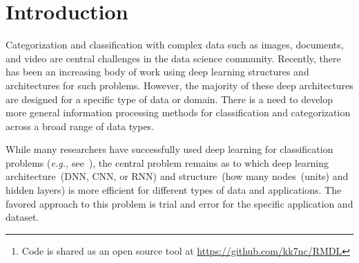 \documentclass[sigconf, final]{acmart}
\begin{document}
\begin{abstract}
The continually increasing number of complex datasets each year necessitates ever improving machine learning methods for robust and accurate categorization of these data. This paper introduces Random Multimodel Deep Learning~(RMDL): a new ensemble, deep learning approach for classification. Deep learning models have achieved state-of-the-art results across many domains.  RMDL solves the problem of finding the best deep learning structure and architecture while simultaneously improving robustness and accuracy through ensembles of deep learning architectures. RDML can accept as input a variety data to include text, video, images, and symbolic. This paper describes RMDL and shows test results for image and text data including MNIST, CIFAR-10, WOS, Reuters, IMDB, and 20newsgroup. These test results show that RDML produces consistently better performance than standard methods over a broad range of data types and classification problems.\footnote{Code is shared as an open source tool at \url{https://github.com/kk7nc/RMDL}}
\end{abstract}








\maketitle

\section{Introduction}\label{sec:introduction}
Categorization and classification with complex data such as images, documents, and video are central challenges in the data science community. Recently, there has been an increasing body of work using deep learning structures and architectures for such problems. However, the majority of these deep architectures are designed for a specific type of data or domain. There is a need to develop more general information processing methods for classification and categorization across a broad range of data types. 


While many researchers have successfully used deep learning for  classification problems (\textit{e.g.,} see~\cite{kowsari2017HDLTex,lecun2015deep,lee2009convolutional,chung2014empirical,turan2017deep}), the central problem remains as to which deep learning architecture~(DNN, CNN, or RNN) and structure~(how many nodes~(units) and hidden layers) is more efficient for different types of data and applications. The favored approach to this problem is 
trial and error for the specific application and dataset.
\end{document}
